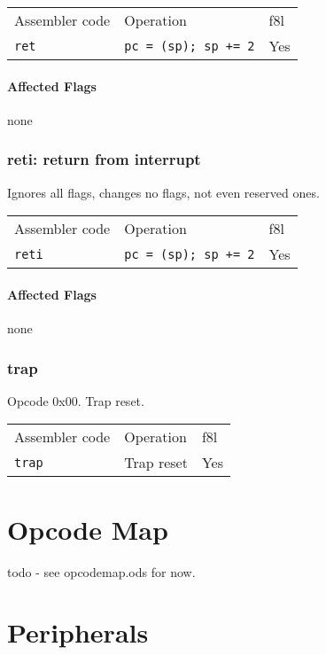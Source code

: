 \documentclass{book}
\begin{document}
\begin{tabular}{l l l}
Assembler code & Operation                   & f8l \\
\texttt{ret}   & \texttt{pc = (sp); sp += 2} & Yes \\
\end{tabular}

\subsubsection*{Affected Flags}

none


\subsection{reti: return from interrupt}

Ignores all flags, changes no flags, not even reserved ones.

\begin{tabular}{l l l}
Assembler code  & Operation                   & f8l \\
\texttt{reti}   & \texttt{pc = (sp); sp += 2} & Yes \\
\end{tabular}

\subsubsection*{Affected Flags}

none


\subsection{trap}

Opcode 0x00. Trap reset.

\begin{tabular}{l l l}
Assembler code  & Operation  & f8l \\
\texttt{trap}   & Trap reset & Yes \\
\end{tabular}


\chapter{Opcode Map}

todo - see opcodemap.ods for now.

\chapter{Peripherals}
\end{document}

